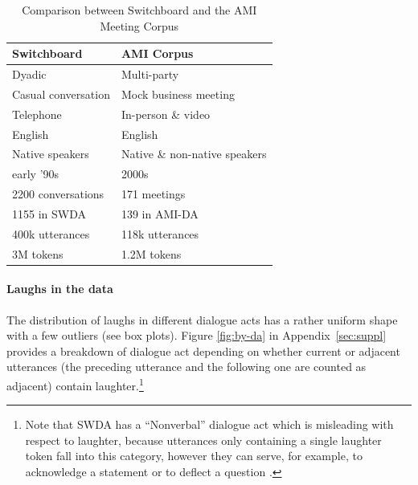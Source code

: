 \documentclass[11pt,a4paper]{article}
\begin{document}

\begin{table}[]
\centering
\begin{tabular}{@{}ll@{}}
\toprule
\textbf{Switchboard}       & \textbf{AMI Corpus}                     \\ \midrule
Dyadic                     & Multi-party                             \\
Casual conversation        & Mock business meeting                   \\
Telephone                  & In-person \& video                      \\ \midrule
English                    & English                                 \\ 
Native speakers            & Native \& non-native speakers           \\ 
early '90s                 & 2000s                                   \\ \midrule
2200 conversations         & 171 meetings                            \\
  \hspace{1em} 1155 in SWDA               & \hspace{1em} 139 in AMI-DA                           \\
400k utterances             & 118k utterances                         \\
3M tokens                  & 1.2M tokens                             \\ \bottomrule
\end{tabular}
  \caption{Comparison between Switchboard and the AMI Meeting Corpus}
  \label{table:corpora}
\end{table}

\paragraph{Laughs in the data}
The distribution of laughs in different dialogue acts has a rather uniform shape with a few outliers (see box plots). Figure \ref{fig:by-da} in Appendix~\ref{sec:suppl} provides a breakdown of dialogue act depending on whether current or adjacent utterances (the preceding utterance and the following one are counted as adjacent) contain laughter.\footnote{Note that SWDA has a ``Nonverbal'' dialogue act which is misleading with respect to laughter, because utterances only containing a single laughter token fall into this category, however they can serve, for example, to acknowledge a statement or to deflect a question  \citep{mazzocconi2019phd}.}
\end{document}
